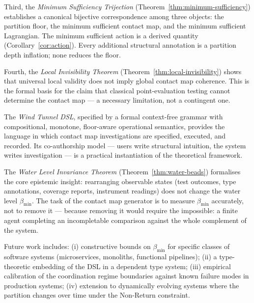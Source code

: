 \documentclass[12pt,a4paper,twocolumn]{article}
\theoremstyle{plain}
\theoremstyle{definition}
\theoremstyle{remark}
\newcommand{\bmin}{\beta_{\min}}
\begin{document}
Third, the \emph{Minimum Sufficiency Trijection}
(Theorem~\ref{thm:minimum-sufficiency}) establishes a canonical bijective
correspondence among three objects: the partition floor, the minimum
sufficient contact map, and the minimum sufficient Lagrangian.  The minimum
sufficient action is a derived quantity (Corollary~\ref{cor:action}).  Every
additional structural annotation is a partition depth inflation; none reduces
the floor.

Fourth, the \emph{Local Invisibility Theorem}
(Theorem~\ref{thm:local-invisibility}) shows that universal local validity
does not imply global contact map coherence.  This is the formal basis for
the claim that classical point-evaluation testing cannot determine the
contact map --- a necessary limitation, not a contingent one.

The \emph{Wind Tunnel DSL}, specified by a formal context-free grammar with
compositional, monotone, floor-aware operational semantics, provides the
language in which contact map investigations are specified, executed, and
recorded.  Its co-authorship model --- users write structural intuition, the
system writes investigation --- is a practical instantiation of the
theoretical framework.

The \emph{Water Level Invariance Theorem} (Theorem~\ref{thm:water-beads})
formalises the core epistemic insight: rearranging observable states (test
outcomes, type annotations, coverage reports, instrument readings) does not
change the water level $\bmin$.  The task of the contact map generator is
to measure $\bmin$ accurately, not to remove it --- because removing it
would require the impossible: a finite agent completing an incompletable
comparison against the whole complement of the system.

Future work includes: (i) constructive bounds on $\bmin$ for specific
classes of software systems (microservices, monoliths, functional pipelines);
(ii) a type-theoretic embedding of the DSL in a dependent type system;
(iii) empirical calibration of the coordination regime boundaries against
known failure modes in production systems; (iv) extension to dynamically
evolving systems where the partition changes over time under the Non-Return
constraint.




\end{document}
